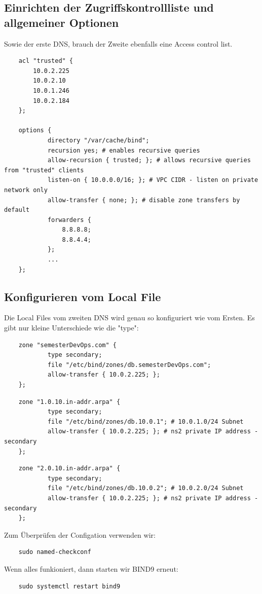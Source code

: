 \documentclass[a4paper,12pt]{article}
\begin{document}
\subsection{Einrichten der Zugriffskontrollliste und allgemeiner Optionen}  

Sowie der erste DNS, brauch der Zweite ebenfalls eine Access control list.
\begin{verbatim}
	acl "trusted" {
		10.0.2.225
		10.0.2.10
		10.0.1.246
		10.0.2.184
	};

	options {
			directory "/var/cache/bind";
			recursion yes; # enables recursive queries
			allow-recursion { trusted; }; # allows recursive queries from "trusted" clients
			listen-on { 10.0.0.0/16; }; # VPC CIDR - listen on private network only
			allow-transfer { none; }; # disable zone transfers by default
			forwarders {
				8.8.8.8;
				8.8.4.4;
			};
			...
	};
\end{verbatim}


\subsection{Konfigurieren vom Local File}
Die Local Files vom zweiten DNS wird genau so konfiguriert wie vom Ersten. 
Es gibt nur kleine Unterschiede wie die "type": 



\begin{verbatim}
	zone "semesterDevOps.com" {
			type secondary;
			file "/etc/bind/zones/db.semesterDevOps.com"; 
			allow-transfer { 10.0.2.225; };
	};
\end{verbatim}


\begin{verbatim}
	zone "1.0.10.in-addr.arpa" {
			type secondary;
			file "/etc/bind/zones/db.10.0.1"; # 10.0.1.0/24 Subnet
			allow-transfer { 10.0.2.225; }; # ns2 private IP address - secondary
	};
\end{verbatim}


\begin{verbatim}
	zone "2.0.10.in-addr.arpa" {
			type secondary;
			file "/etc/bind/zones/db.10.0.2"; # 10.0.2.0/24 Subnet
			allow-transfer { 10.0.2.225; }; # ns2 private IP address - secondary
	};
\end{verbatim}

Zum Überprüfen der Configation verwenden wir:
\begin{verbatim}
	sudo named-checkconf
\end{verbatim}

Wenn alles funkioniert, dann starten wir BIND9 erneut:
\begin{verbatim}
	sudo systemctl restart bind9
\end{verbatim}
\end{document}
